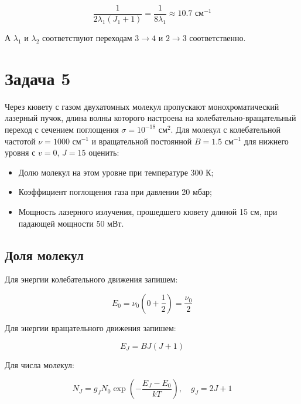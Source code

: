 \documentclass[a4paper, 12pt]{article}
\begin{document}
\begin{equation}
	\frac{1}{2\lambda_1 (J_1 + 1)} = \frac{1}{8 \lambda_1} \approx 10.7 \text{ см$^{-1}$}
\end{equation}

А $\lambda_1$ и $\lambda_2$ соответствуют переходам $3\rightarrow 4$ и $2\rightarrow 3$ соответственно.

\section*{Задача 5}

Через кювету с газом двухатомных молекул пропускают монохроматический лазерный пучок, длина волны которого настроена на колебательно-вращательный переход с сечением поглощения $\sigma =  10^{-18}$ см$^2$. Для молекул с колебательной частотой $\nu = 1000$ см$^{-1}$ и вращательной постоянной $B = 1.5$ см$^{-1}$ для нижнего уровня с $v = 0$, $J=15$ оценить:
\begin{itemize}
	\item Долю молекул на этом уровне при температуре 300 К;
	
	\item Коэффициент поглощения газа при давлении 20 мбар;
	
	\item Мощность лазерного излучения, прошедшего кювету длиной 15 см, при падающей мощности 50 мВт.
\end{itemize}

\subsection*{Доля молекул}

Для энергии колебательного движения запишем:

\begin{equation}
	E_0 = \nu_0 \left(0 + \frac{1}{2}\right)  = \frac{\nu_0}{2}
\end{equation}

Для энергии вращательного движения запишем:

\begin{equation}
	E_J = B J (J+1)
\end{equation}

Для числа молекул:

\begin{equation}
	N_J = g_J N_0 \exp\left(- \frac{E_J - E_0}{k T}\right), \quad g_J = 2 J + 1
\end{equation}
\end{document}
